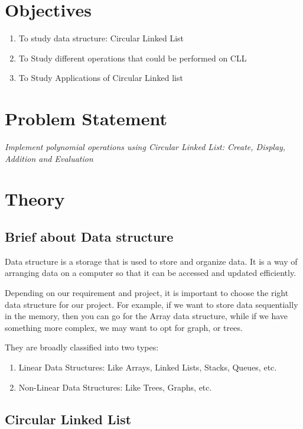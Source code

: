 \documentclass[11pt]{article}
\begin{document}
\tableofcontents
\thispagestyle{empty}
\clearpage

\setcounter{page}{1}

\section{Objectives}
\begin{enumerate}
	\item To study data structure: Circular Linked List
	\item To Study different operations that could be performed on CLL
	\item To Study Applications of Circular Linked list
\end{enumerate}

\section{Problem Statement}
\textit{Implement polynomial operations using Circular Linked List: Create, Display, Addition and
	Evaluation}
\section{Theory}

\subsection{Brief about Data structure}
Data structure is a storage that is used to store and organize data. It is a way of arranging data on a computer so that it can be accessed and updated efficiently.

Depending on our requirement and project, it is important to choose the right data structure for our project. For example, if we want to store data sequentially in the memory, then you can go for the Array data structure, while if we have something more complex, we may want to opt for graph, or trees.

They are broadly classified into two types:
\begin{enumerate}
	\item Linear Data Structures: Like Arrays, Linked Lists, Stacks, Queues, etc.
	\item Non-Linear Data Structures: Like Trees, Graphs, etc.
\end{enumerate}


\subsection{Circular Linked List}
\end{document}
